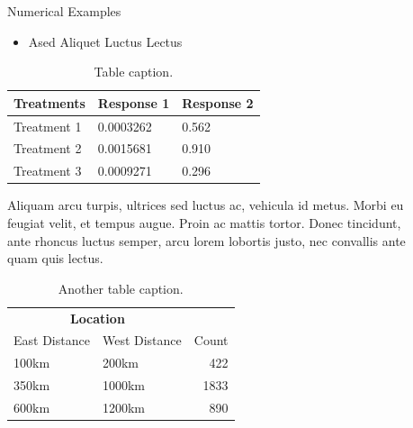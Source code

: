 \documentclass{beamer} %
\begin{document}
\begin{frame}[t]
\begin{columns}[t]
\begin{column}{0.465\textwidth}

\end{column} %

\begin{column}{0.03\textwidth}\end{column} %
 
\begin{column}{0.465\textwidth} %


\begin{block}{Numerical Examples}
	\begin{itemize}
		\item Ased Aliquet Luctus Lectus
	\end{itemize}
	
	\begin{table}
		\caption{Table caption.}
		\begin{tabular}{l l l}
			\toprule
			\textbf{Treatments} & \textbf{Response 1} & \textbf{Response 2}\\
			\midrule
			Treatment 1 & 0.0003262 & 0.562 \\
			Treatment 2 & 0.0015681 & 0.910 \\
			Treatment 3 & 0.0009271 & 0.296 \\
			\bottomrule
		\end{tabular}
	\end{table}
	
	\bigskip\bigskip %
	
	Aliquam arcu turpis, ultrices sed luctus ac, vehicula id metus. Morbi eu feugiat velit, et tempus augue. Proin ac mattis tortor. Donec tincidunt, ante rhoncus luctus semper, arcu lorem lobortis justo, nec convallis ante quam quis lectus.
	
	\begin{table} %
		\caption{Another table caption.}
		\begin{tabular}{l l r}
			\toprule
			\multicolumn{2}{c}{\textbf{Location}} \\
			\cmidrule(r){1-2}
			East Distance & West Distance & Count \\
			\midrule
			100km & 200km & 422 \\
			350km & 1000km & 1833 \\
			600km & 1200km & 890 \\
			\bottomrule
		\end{tabular}
	\end{table}
	

\end{block}
\end{column}
\end{columns}
\end{frame}
\end{document}
